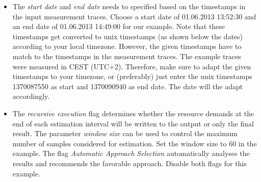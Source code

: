 \begin{itemize}
            \item The \emph{start date} and \emph{end date} needs to specified based on the timestamps in the input measurement traces. Choose a start date of 01.06.2013 13:52:30 and an end date of 01.06.2013 14:49:00 for our example. 
            Note that these timestamps get converted to unix timestamps (as shown below the dates) according to your local timezone. 
            However, the given timestamps have to match to the timestamps in the measurement traces. The example traces were measured in CEST (UTC+2). Therefore, make sure to adapt the given timestamps to your timezone, or (preferably) just enter the unix timestamps 1370087550 as start and 1370090940 as end date. The date will the adapt accordingly.
			
			\item The \emph{recursive execution} flag determines whether the resource demands at the end of each estimation interval will be written to the output or only the final result. The parameter \emph{window size} can be used to control the maximum number of samples considered for estimation. Set the window size to 60 in the example. 
            The flag \emph{Automatic Approach Selection} automatically analyses the results and recommends the favorable approach. 
            Disable both flags for this example.
			
			
		

\end{itemize}
